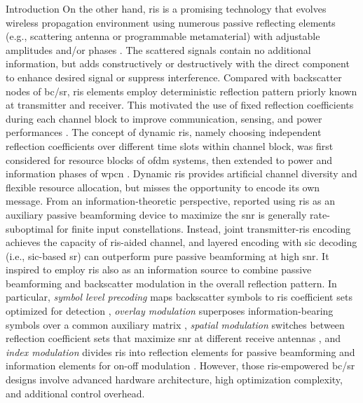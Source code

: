 \documentclass[journal]{IEEEtran}
\begin{document}
\begin{section}{Introduction}
	On the other hand, \gls{ris} is a promising technology that evolves wireless propagation environment using numerous passive reflecting elements (e.g., scattering antenna or programmable metamaterial) with adjustable amplitudes and/or phases \cite{Wu2021b}.
	The scattered signals contain no additional information, but adds constructively or destructively with the direct component to enhance desired signal or suppress interference.
	Compared with backscatter nodes of \gls{bc}/\gls{sr}, \gls{ris} elements employ deterministic reflection pattern priorly known at transmitter and receiver.
	This motivated the use of fixed reflection coefficients during each channel block to improve communication, sensing, and power performances \cite{Wu2018,Zhang2019a,Lin2022,Liu2022,Feng2022,Zhao2022}.
	The concept of dynamic \gls{ris}, namely choosing independent reflection coefficients over different time slots within channel block, was first considered for resource blocks of \gls{ofdm} systems, then extended to power and information phases of \gls{wpcn} \cite{Wu2021,Wu2021d,Hua2022a}.
	Dynamic \gls{ris} provides artificial channel diversity and flexible resource allocation, but misses the opportunity to encode its own message.
	From an information-theoretic perspective, \cite{Karasik2020} reported using \gls{ris} as an auxiliary passive beamforming device to maximize the \gls{snr} is generally rate-suboptimal for finite input constellations.
	Instead, joint transmitter-\gls{ris} encoding achieves the capacity of \gls{ris}-aided channel, and layered encoding with \gls{sic} decoding (i.e., \gls{sic}-based \gls{sr}) can outperform pure passive beamforming at high \gls{snr}.
	It inspired \cite{Liu2019d,Bereyhi2020,Xu2020b,Zhang2021d,Hu2021b,Hua2022,Basar2020,Ma2020a,Yuan2021,Hu2021a} to employ \gls{ris} also as an information source to combine passive beamforming and backscatter modulation in the overall reflection pattern.
	In particular, \emph{symbol level precoding} maps backscatter symbols to \gls{ris} coefficient sets optimized for detection \cite{Liu2019d,Bereyhi2020}, \emph{overlay modulation} superposes information-bearing symbols over a common auxiliary matrix \cite{Xu2020b,Zhang2021d,Hu2021b,Hua2022}, \emph{spatial modulation} switches between reflection coefficient sets that maximize \gls{snr} at different receive antennas \cite{Basar2020,Ma2020a,Yuan2021}, and \emph{index modulation} divides \gls{ris} into reflection elements for passive beamforming and information elements for on-off modulation \cite{Hu2021a}.
	However, those \gls{ris}-empowered \gls{bc}/\gls{sr} designs involve advanced hardware architecture, high optimization complexity, and additional control overhead.


\end{section}
\end{document}
